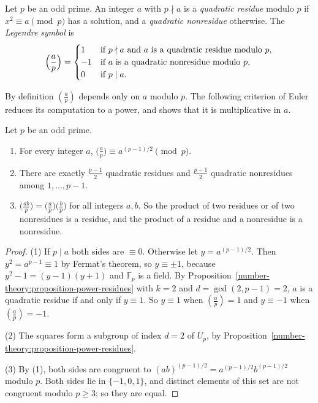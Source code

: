 \begin{definition}\label{number-theory:definition-legendre}
Let $p$ be an odd prime. An integer $a$ with $p \nmid a$ is a \emph{quadratic residue} modulo $p$ if $x^2 \equiv a \pmod p$ has a solution, and a \emph{quadratic nonresidue} otherwise. The
\emph{Legendre symbol} is
\[
\Bigl(\frac{a}{p}\Bigr) = \begin{cases} 1 & \text{if } p \nmid a \text{ and } a \text{ is a quadratic residue modulo } p, \\ -1 & \text{if } a \text{ is a quadratic nonresidue modulo } p, \\
0 & \text{if } p \mid a. \end{cases}
\]
\end{definition}

By definition $(\frac{a}{p})$ depends only on $a$ modulo $p$. The following criterion of Euler reduces its computation to a power, and shows that it is multiplicative in $a$.

\begin{proposition}\label{number-theory:proposition-euler-criterion}
Let $p$ be an odd prime.
\begin{enumerate}
\item For every integer $a$, $\bigl(\frac{a}{p}\bigr) \equiv a^{(p-1)/2} \pmod p$.
\item There are exactly $\frac{p-1}{2}$ quadratic residues and $\frac{p-1}{2}$ quadratic nonresidues among $1, \ldots, p - 1$.
\item $\bigl(\frac{ab}{p}\bigr) = \bigl(\frac{a}{p}\bigr)\bigl(\frac{b}{p}\bigr)$ for all integers $a, b$. So the product of two residues or of two nonresidues is a residue, and the product of a residue and a
nonresidue is a nonresidue.
\end{enumerate}
\end{proposition}

\begin{proof}
(1) If $p \mid a$ both sides are $\equiv 0$. Otherwise let $y = a^{(p-1)/2}$. Then $y^2 = a^{p-1} \equiv 1$ by Fermat's theorem, so $y \equiv \pm1$, because $y^2 - 1 = (y - 1)(y + 1)$ and $\mathbb{F}_p$ is a
field. By Proposition~\ref{number-theory:proposition-power-residues} with $k = 2$ and $d = \gcd(2, p - 1) = 2$, $a$ is a quadratic residue if and only if $y \equiv 1$. So $y \equiv 1$ when
$(\frac{a}{p}) = 1$ and $y \equiv -1$ when $(\frac{a}{p}) = -1$.

(2) The squares form a subgroup of index $d = 2$ of $U_p$, by Proposition~\ref{number-theory:proposition-power-residues}.

(3) By (1), both sides are congruent to $(ab)^{(p-1)/2} = a^{(p-1)/2}b^{(p-1)/2}$ modulo $p$. Both sides lie in $\{-1, 0, 1\}$, and distinct elements of this set are not congruent modulo $p \geq 3$; so they
are equal.
\end{proof}

